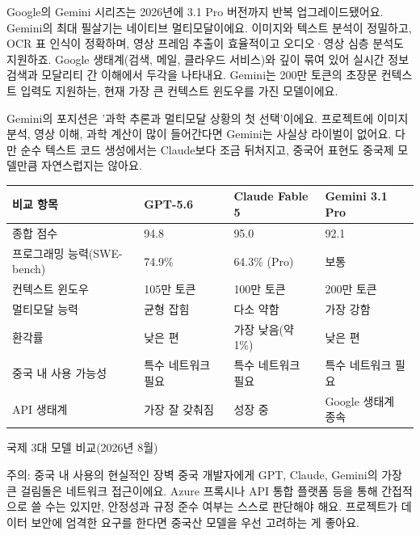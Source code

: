 
Google의 Gemini 시리즈는 2026년에 3.1 Pro 버전까지 반복 업그레이드됐어요. Gemini의 최대 필살기는 네이티브 멀티모달이에요. 이미지와 텍스트 분석이 정밀하고, OCR 표 인식이 정확하며, 영상 프레임 추출이 효율적이고 오디오·영상 심층 분석도 지원하죠. Google 생태계(검색, 메일, 클라우드 서비스)와 깊이 묶여 있어 실시간 정보 검색과 모달리티 간 이해에서 두각을 나타내요. Gemini는 200만 토큰의 초장문 컨텍스트 입력도 지원하는, 현재 가장 큰 컨텍스트 윈도우를 가진 모델이에요.

Gemini의 포지션은 '과학 추론과 멀티모달 상황의 첫 선택'이에요. 프로젝트에 이미지 분석, 영상 이해, 과학 계산이 많이 들어간다면 Gemini는 사실상 라이벌이 없어요. 다만 순수 텍스트 코드 생성에서는 Claude보다 조금 뒤처지고, 중국어 표현도 중국제 모델만큼 자연스럽지는 않아요.

\begin{center}
\begin{tabularx}{\linewidth}{|X|X|X|X|}
\hline
\textbf{비교 항목} & \textbf{GPT-5.6} & \textbf{Claude Fable 5} & \textbf{Gemini 3.1 Pro} \tabularnewline
\hline
종합 점수 & 94.8 & 95.0 & 92.1 \tabularnewline
프로그래밍 능력(SWE-bench) & 74.9\% & 64.3\% (Pro) & 보통 \tabularnewline
컨텍스트 윈도우 & 105만 토큰 & 100만 토큰 & 200만 토큰 \tabularnewline
멀티모달 능력 & 균형 잡힘 & 다소 약함 & 가장 강함 \tabularnewline
환각률 & 낮은 편 & 가장 낮음(약 1\%) & 낮은 편 \tabularnewline
중국 내 사용 가능성 & 특수 네트워크 필요 & 특수 네트워크 필요 & 특수 네트워크 필요 \tabularnewline
API 생태계 & 가장 잘 갖춰짐 & 성장 중 & Google 생태계 종속 \tabularnewline
\hline
\end{tabularx}
\end{center}

\begin{center}\small\color{gray}국제 3대 모델 비교(2026년 8월)\end{center}

\begin{tcbwarn}{주의: 중국 내 사용의 현실적인 장벽}
중국 개발자에게 GPT, Claude, Gemini의 가장 큰 걸림돌은 네트워크 접근이에요. Azure 프록시나 API 통합 플랫폼 등을 통해 간접적으로 쓸 수는 있지만, 안정성과 규정 준수 여부는 스스로 판단해야 해요. 프로젝트가 데이터 보안에 엄격한 요구를 한다면 중국산 모델을 우선 고려하는 게 좋아요.

\end{tcbwarn}



